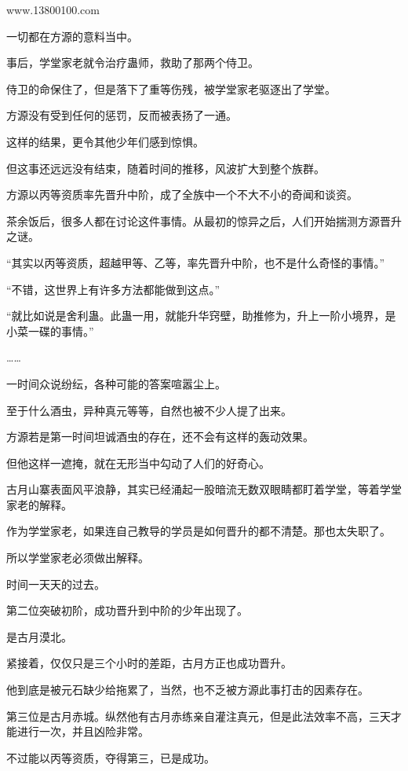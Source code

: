 
\begin{this_body}

www.13800100.com

一切都在方源的意料当中。

事后，学堂家老就令治疗蛊师，救助了那两个侍卫。

侍卫的命保住了，但是落下了重等伤残，被学堂家老驱逐出了学堂。

方源没有受到任何的惩罚，反而被表扬了一通。

这样的结果，更令其他少年们感到惊惧。

但这事还远远没有结束，随着时间的推移，风波扩大到整个族群。

方源以丙等资质率先晋升中阶，成了全族中一个不大不小的奇闻和谈资。

茶余饭后，很多人都在讨论这件事情。从最初的惊异之后，人们开始揣测方源晋升之谜。

“其实以丙等资质，超越甲等、乙等，率先晋升中阶，也不是什么奇怪的事情。”

“不错，这世界上有许多方法都能做到这点。”

“就比如说是舍利蛊。此蛊一用，就能升华窍壁，助推修为，升上一阶小境界，是小菜一碟的事情。”

……

一时间众说纷纭，各种可能的答案喧嚣尘上。

至于什么酒虫，异种真元等等，自然也被不少人提了出来。

方源若是第一时间坦诚酒虫的存在，还不会有这样的轰动效果。

但他这样一遮掩，就在无形当中勾动了人们的好奇心。

古月山寨表面风平浪静，其实已经涌起一股暗流无数双眼睛都盯着学堂，等着学堂家老的解释。

作为学堂家老，如果连自己教导的学员是如何晋升的都不清楚。那也太失职了。

所以学堂家老必须做出解释。

时间一天天的过去。

第二位突破初阶，成功晋升到中阶的少年出现了。

是古月漠北。

紧接着，仅仅只是三个小时的差距，古月方正也成功晋升。

他到底是被元石缺少给拖累了，当然，也不乏被方源此事打击的因素存在。

第三位是古月赤城。纵然他有古月赤练亲自灌注真元，但是此法效率不高，三天才能进行一次，并且凶险非常。

不过能以丙等资质，夺得第三，已是成功。


\end{this_body}
